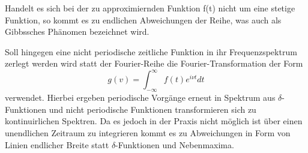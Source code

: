 Handelt es sich bei der zu approximiernden Funktion f(t) nicht um eine
stetige Funktion, so kommt es zu endlichen Abweichungen der Reihe,
was auch als Gibbssches Phänomen bezeichnet wird.

Soll hingegen eine nicht periodische zeitliche Funktion in ihr
Frequenzspektrum zerlegt werden wird statt der Fourier-Reihe die
Fourier-Transformation der Form
\begin{equation}
  g(v) = \int_{-\infty}^{\infty} f(t)e^{i\nu t} dt
\end{equation}
verwendet. Hierbei ergeben periodische Vorgänge erneut in Spektrum aus
$\delta$-Funktionen und nicht periodische Funktionen transformieren sich zu
kontinuirlichen
Spektren. Da es jedoch in der Praxis nicht möglich ist über einen unendlichen
Zeitraum zu integrieren kommt es zu Abweichungen in Form von Linien endlicher
Breite statt $\delta$-Funktionen und Nebenmaxima.
